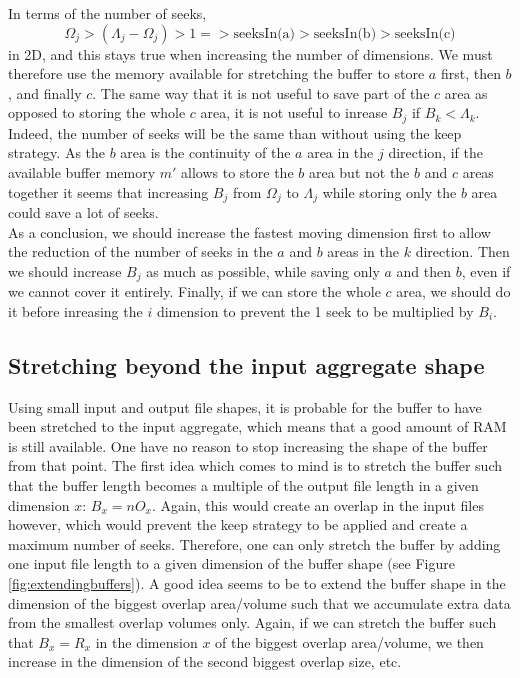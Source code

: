 \documentclass[conference]{IEEEtran}
\begin{document}
In terms of the number of seeks, $$\Omega_j > (\Lambda_j-\Omega_j) > 1 => \textrm{seeksIn(a)} > \textrm{seeksIn(b)} > \textrm{seeksIn(c)}$$ in 2D, and this stays true when increasing the number of dimensions.
We must therefore use the memory available for stretching the buffer to store $a$ first, then $b$, and finally $c$.
The same way that it is not useful to save part of the $c$ area as opposed to storing the whole $c$ area, it is not useful to inrease $B_j$ if $B_k < \Lambda_k$.
Indeed, the number of seeks will be the same than without using the keep strategy.
As the $b$ area is the continuity of the $a$ area in the $j$ direction, if the available buffer memory $m'$ allows to store the $b$ area but not the $b$ and $c$ areas together it seems that increasing $B_j$ from $\Omega_j$ to $\Lambda_j$ while storing only the $b$ area could save a lot of seeks. \\

As a conclusion, we should increase the fastest moving dimension first to allow the reduction of the number of seeks in the $a$ and $b$ areas in the $k$ direction.
Then we should increase $B_j$ as much as possible, while saving only $a$ and then $b$, even if we cannot cover it entirely.
Finally, if we can store the whole $c$ area, we should do it before inreasing the $i$ dimension to prevent the 1 seek to be multiplied by $B_i$. \\

\subsection{Stretching beyond the input aggregate shape}
Using small input and output file shapes, it is probable for the buffer to have been stretched to the input aggregate, which means that a good amount of RAM is still available.
One have no reason to stop increasing the shape of the buffer from that point.
The first idea which comes to mind is to stretch the buffer such that the buffer length becomes a multiple of the output file length in a given dimension $x$: $B_x = nO_x$.
Again, this would create an overlap in the input files however, which would prevent the keep strategy to be applied and create a maximum number of seeks.
Therefore, one can only stretch the buffer by adding one input file length to a given dimension of the buffer shape (see Figure \ref{fig:extendingbuffers}).
A good idea seems to be to extend the buffer shape in the dimension of the biggest overlap area/volume such that we accumulate extra data from the smallest overlap volumes only.
Again, if we can stretch the buffer such that $B_x = R_x$ in the dimension $x$ of the biggest overlap area/volume, we then increase in the dimension of the second biggest overlap size, etc.
\end{document}
